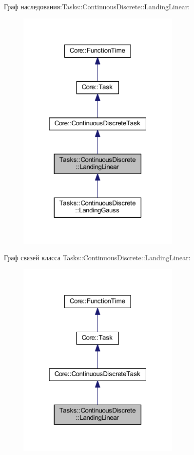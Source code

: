 Граф наследования\+:Tasks\+:\+:Continuous\+Discrete\+:\+:Landing\+Linear\+:\nopagebreak
\begin{figure}[H]
\begin{center}
\leavevmode
\includegraphics[width=229pt]{class_tasks_1_1_continuous_discrete_1_1_landing_linear__inherit__graph}
\end{center}
\end{figure}


Граф связей класса Tasks\+:\+:Continuous\+Discrete\+:\+:Landing\+Linear\+:\nopagebreak
\begin{figure}[H]
\begin{center}
\leavevmode
\includegraphics[width=229pt]{class_tasks_1_1_continuous_discrete_1_1_landing_linear__coll__graph}
\end{center}
\end{figure}


